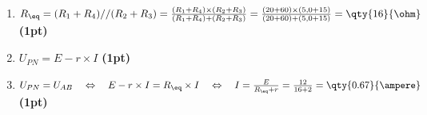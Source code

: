 \begin{enumerate}
    \item $R_{\eq}=(R_1+R_4)//(R_2+R_3)=
          \frac{(R_1+R_4)\times(R_2+R_3)}{(R_1+R_4)+(R_2+R_3)}=
          \frac{(20+60)\times(5,0+15)}{(20+60)+(5,0+15)}=\qty{16}{\ohm}$
          \hfill\textbf{(1pt)}

    \item $U_{PN}=E-r\times I$
          \hfill\textbf{(1pt)}

    \item $U_{PN}=U_{AB}
          \quad\Leftrightarrow\quad
          E-r\times I=R_{\eq}\times I
          \quad\Leftrightarrow\quad
          I=\frac{E}{R_{\eq}+r}=
          \frac{12}{16+2}=\qty{0.67}{\ampere}$
          \hfill\textbf{(1pt)}
\end{enumerate}

